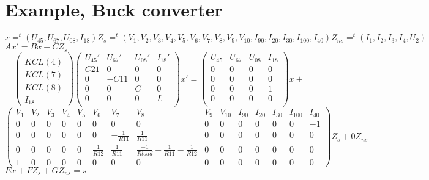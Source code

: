 \section{Example, Buck converter}
\begin{figure}[h]
\centerline{
 \scalebox{1.0}{
    
 }
}\end{figure}
$x=^{t}(U_{45},U_{67},U_{08},I_{18}) Z_{s}=^{t}(V_{1},V_{2},V_{3},V_{4},V_{5},V_{6},V_{7},V_{8},V_{9},V_{10},I_{90},I_{20},I_{30},I_{100},I_{40})
Z_{ns}=^{t}(I_{1},I_{2},I_{3},I_{4},U_{2})$\\
\underline{$Ax'= Bx+CZ_{s}$}
\[\left(\begin{array}{c}
  \\
KCL(4)\\KCL(7)\\KCL(8)\\I_{18}
\end{array}\right)
\left(\begin{array}{cccc}
  U_{45}'&U_{67}'&U_{08}'&I_{18}'\\
  \hline
  C21&0&0&0\\
  0&-C11&0&0\\
  0&0&C&0\\
  0&0&0&L\\  
\end{array}\right)x'=
\left(\begin{array}{cccc}
  U_{45}&U_{67}&U_{08}&I_{18}\\
  \hline
  0&0&0&0\\
  0&0&0&0\\
  0&0&0&1\\
  0&0&0&0\\
\end{array}\right)x+\]
\[
\left(\begin{array}{ccccccccccccccc}
  V_{1}&V_{2}&V_{3}&V_{4}&V_{5}&V_{6}&V_{7}&V_{8}&V_{9}&V_{10}&I_{90}&I_{20}&I_{30}&I_{100}&I_{40}\\
  \hline
  0&0&0&0&0&0&0&0&0&0&0&0&0&0&-1\\
  0&0&0&0&0&0&-\frac{1}{R11}&\frac{1}{R11}&0&0&0&0&0&0&0\\
  0&0&0&0&0&\frac{1}{R12}&\frac{1}{R11}&\frac{-1}{Rload}-\frac{1}{R11}-\frac{1}{R12}&0&0&0&0&0&0&0\\
  1&0&0&0&0&0&0&0&0&0&0&0&0&0&0
\end{array}\right)Z_{s}+0Z_{ns}\]
\underline{$Ex+FZ_{s}+GZ_{ns}=s$}
